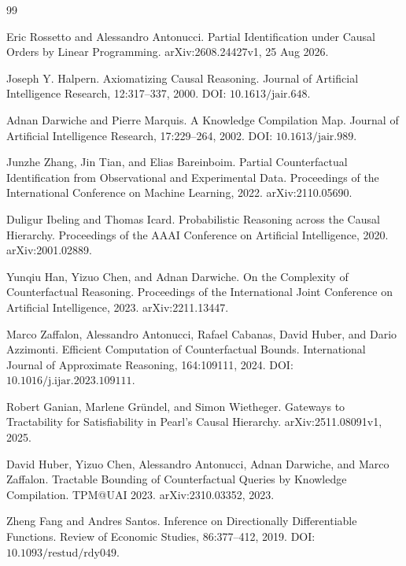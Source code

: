\documentclass{article}
\begin{document}
\begin{thebibliography}{99}

   Eric Rossetto and Alessandro Antonucci. Partial Identification under Causal Orders by Linear Programming. arXiv:2608.24427v1, 25 Aug 2026.

   Joseph Y. Halpern. Axiomatizing Causal Reasoning. Journal of Artificial Intelligence Research, 12:317--337, 2000. DOI: \(10.1613/\mathrm{jair}.648\).

   Adnan Darwiche and Pierre Marquis. A Knowledge Compilation Map. Journal of Artificial Intelligence Research, 17:229--264, 2002. DOI: \(10.1613/\mathrm{jair}.989\).

   Junzhe Zhang, Jin Tian, and Elias Bareinboim. Partial Counterfactual Identification from Observational and Experimental Data. Proceedings of the International Conference on Machine Learning, 2022. arXiv:2110.05690.

   Duligur Ibeling and Thomas Icard. Probabilistic Reasoning across the Causal Hierarchy. Proceedings of the AAAI Conference on Artificial Intelligence, 2020. arXiv:2001.02889.

   Yunqiu Han, Yizuo Chen, and Adnan Darwiche. On the Complexity of Counterfactual Reasoning. Proceedings of the International Joint Conference on Artificial Intelligence, 2023. arXiv:2211.13447.

   Marco Zaffalon, Alessandro Antonucci, Rafael Cabanas, David Huber, and Dario Azzimonti. Efficient Computation of Counterfactual Bounds. International Journal of Approximate Reasoning, 164:109111, 2024. DOI: \(10.1016/\mathrm{j.ijar}.2023.109111\).

   Robert Ganian, Marlene Gr\"{u}ndel, and Simon Wietheger. Gateways to Tractability for Satisfiability in Pearl's Causal Hierarchy. arXiv:2511.08091v1, 2025.

   David Huber, Yizuo Chen, Alessandro Antonucci, Adnan Darwiche, and Marco Zaffalon. Tractable Bounding of Counterfactual Queries by Knowledge Compilation. TPM@UAI 2023. arXiv:2310.03352, 2023.

   Zheng Fang and Andres Santos. Inference on Directionally Differentiable Functions. Review of Economic Studies, 86:377--412, 2019. DOI: \(10.1093/\mathrm{restud}/\mathrm{rdy049}\).

\end{thebibliography}
\end{document}
